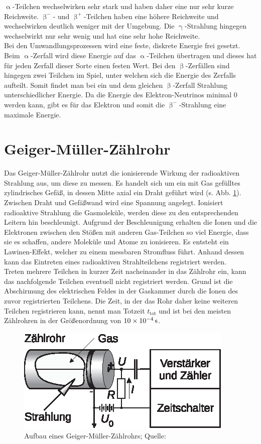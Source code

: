 $\upalpha$-Teilchen wechselwirken sehr stark und haben daher eine nur sehr kurze Reichweite. $\upbeta^-$- und $\upbeta^+$-Teilchen haben eine höhere Reichweite und wechselwirken deutlich weniger mit der Umgebung. Die $\upgamma$-Strahlung hingegen wechselwirkt nur sehr wenig und hat eine sehr hohe Reichweite.\\
Bei den Umwandlungsprozessen wird eine feste, diskrete Energie frei gesetzt. Beim $\upalpha$-Zerfall wird diese Energie auf das $\upalpha$-Teilchen übertragen und dieses hat für jeden Zerfall dieser Sorte einen festen Wert. Bei den $\upbeta$-Zerfällen sind hingegen zwei Teilchen im Spiel, unter welchen sich die Energie des Zerfalls aufteilt. Somit findet man bei ein und dem gleichen $\upbeta$-Zerfall Strahlung unterschiedlicher Energie. Da die Energie des Elektron-Neutrinos minimal 0 werden kann, gibt es für das Elektron und somit die $\upbeta^-$-Strahlung eine maximale Energie. \cite{EKS07}

\section{Geiger-Müller-Zählrohr}
Das Geiger-Müller-Zählrohr nutzt die ionisierende Wirkung der radioaktiven Strahlung aus, um diese zu messen. Es handelt sich um ein mit Gas gefülltes zylindrisches Gefäß, in dessen Mitte axial ein Draht geführt wird (s. Abb. \ref{fig:i_03_geigermueller}). Zwischen Draht und Gefäßwand wird eine Spannung angelegt. Ionisiert radioaktive Strahlung die Gasmoleküle, werden diese zu den entsprechenden Leitern hin beschleunigt. Aufgrund der Beschleunigung erhalten die Ionen und die Elektronen zwischen den Stößen mit anderen Gas-Teilchen so viel Energie, dass sie es schaffen, andere Moleküle und Atome zu ionisieren. Es entsteht ein Lawinen-Effekt, welcher zu einem messbaren Stromfluss führt. Anhand dessen kann das Eintreten eines radioaktiven Strahlteilchens registriert werden.\\
Treten mehrere Teilchen in kurzer Zeit nacheinander in das Zählrohr ein, kann das nachfolgende Teilchen eventuell nicht registriert werden. Grund ist die Abschirmung des elektrischen Feldes in der Gaskammer durch die Ionen des zuvor registrierten Teilchens. Die Zeit, in der das Rohr daher keine weiteren Teilchen registrieren kann, nennt man Totzeit $t_\mathrm{tot}$ und ist bei den meisten Zählrohren in der Größenordnung von $\SI{10E-4}{s}$.

\begin{figure}[ht]
\centering
\includegraphics{fig/i_03_geigermueller.eps}
\caption{Aufbau eines Geiger-Müller-Zählrohrs; Quelle: \cite[S. 514]{EKS07}}
\label{fig:i_03_geigermueller}
\end{figure}

